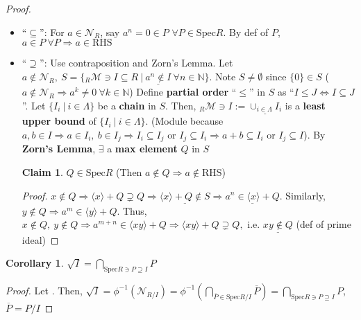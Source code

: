 \documentclass[12pt,a4paper]{article}
\theoremstyle{definition}
\newtheorem{corollary}{Corollary}
\newtheorem{claim}{Claim}
\begin{document}
\noindent\textit{Proof.}
\begin{itemize}
  \item ``$\subseteq$'': For $a \in \mathcal{N}_R$, say \underline{$a^n = 0 \in P$} $\forall P \in \text{Spec}R$. By def of $P$, $a \in P\ \forall P \Rightarrow a \in \text{RHS}$
  \item ``$\supseteq$'': Use contraposition and Zorn's Lemma. Let $a \notin \mathcal{N}_R,\ S = \{\text{}_R\mathcal{M} \ni I \subseteq R\ |\ \underline{a^n \notin I}\ \forall n \in \mathbb{N}\}$. Note \underline{$S \neq \emptyset$} since \underline{$\{0\} \in S$} ($a \notin \mathcal{N}_R \Rightarrow a^k \neq 0\ \forall k \in \mathbb{N}$)\newline\newline
  \noindent Define \textbf{partial order} ``$\leq$'' in $S$ as ``$I \leq J \Leftrightarrow I \subseteq J$''. Let \underline{$\{I_i\ |\ i \in \Lambda\}$} be a \textbf{chain} in $S$. Then, $\text{}_R\mathcal{M} \ni I := \underline{\cup_{i \in \Lambda} I_i}$ is a \textbf{least upper bound} of $\{I_i\ |\ i \in \Lambda\}$. (Module because $a, b \in I \Rightarrow a \in I_i,\ b \in I_j \Rightarrow I_i \subseteq I_j \text{ or } I_j \subseteq I_i \Rightarrow a + b \subseteq I_i \text{ or } I_j \subseteq I$). By \textbf{Zorn's Lemma}, $\exists$ a \textbf{max element} $Q$ in $S$
  
  \begin{claim}
    $\boxed{Q \in \text{Spec}R}$ (Then $a \notin Q \Rightarrow a \notin \text{RHS}$)
  \end{claim}
  \vspace{-2.0em}\begin{proof}
    $x \notin Q \Rightarrow \langle x \rangle + Q \supsetneq Q \Rightarrow \underline{\langle x \rangle + Q \notin S} \Rightarrow \underline{a^n \in \langle x \rangle + Q}$. Similarly, $y \notin Q \Rightarrow a^m \in \langle y \rangle + Q$. Thus, $x \notin Q,\ y \notin Q \Rightarrow a^{m + n} \in \langle xy \rangle + Q \Rightarrow \langle xy \rangle + Q \supsetneq Q, \text{ i.e. } \underline{xy \notin Q}$ (def of prime ideal)
  \end{proof}
\end{itemize}

\begin{corollary}
  $\sqrt{I} = \bigcap_{\text{Spec}R \ni P \supseteq I} P$
\end{corollary}

\begin{proof}
  Let . Then, $\sqrt{I} = \phi^{-1}(\mathcal{N}_{R/I}) = \phi^{-1}(\bigcap_{\overline{P} \in \text{Spec}R/I} \overline{P}) = \bigcap_{\text{Spec}R \ni P \supseteq I} P$, $\overline{P} = P/I$
\end{proof}
\vspace{0.125em}
\end{document}
